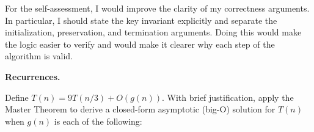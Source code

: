 \documentclass[11pt,addpoints,answers]{exam}
\theoremstyle{plain}            %
\theoremstyle{definition}       %
\theoremstyle{remark}           %
\begin{document}
\begin{questions}
  \begin{solution}
For the self-assessment, I would improve the clarity of my correctness arguments. In particular, I should state the key invariant explicitly and separate the initialization, preservation, and termination arguments. Doing this would make the logic easier to verify and would make it clearer why each step of the algorithm is valid.
\end{solution}

     \question \textbf{Recurrences.} \nopagebreak
  
  Define $T(n)= 9T(n/3) + O(g(n))$.
  With brief justification, apply the Master Theorem to derive a closed-form asymptotic (big-O) solution for $T(n)$ when $g(n)$ is each of the following:




\end{questions}
\end{document}
